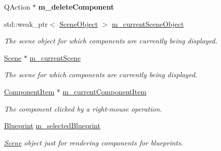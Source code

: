 \begin{Indent}
\begin{DoxyCompactItemize}
Q\+Action $\ast$ {\bfseries m\+\_\+delete\+Component}
\item 
\mbox{\label{classrev_1_1_view_1_1_component_tree_widget_aafbbd9c596409966bf652bde8aff2223}} 
std\+::weak\+\_\+ptr$<$ \mbox{\hyperlink{classrev_1_1_scene_object}{Scene\+Object}} $>$ \mbox{\hyperlink{classrev_1_1_view_1_1_component_tree_widget_aafbbd9c596409966bf652bde8aff2223}{m\+\_\+current\+Scene\+Object}}
\begin{DoxyCompactList}\small\item\em The scene object for which components are currently being displayed. \end{DoxyCompactList}\item 
\mbox{\label{classrev_1_1_view_1_1_component_tree_widget_aee6a1cb97bed994d615a6575bdf60327}} 
\mbox{\hyperlink{classrev_1_1_scene}{Scene}} $\ast$ \mbox{\hyperlink{classrev_1_1_view_1_1_component_tree_widget_aee6a1cb97bed994d615a6575bdf60327}{m\+\_\+current\+Scene}}
\begin{DoxyCompactList}\small\item\em The scene for which components are currently being displayed. \end{DoxyCompactList}\item 
\mbox{\label{classrev_1_1_view_1_1_component_tree_widget_aef937872f23a2d4a2eff96e8545c1eac}} 
\mbox{\hyperlink{classrev_1_1_view_1_1_component_item}{Component\+Item}} $\ast$ \mbox{\hyperlink{classrev_1_1_view_1_1_component_tree_widget_aef937872f23a2d4a2eff96e8545c1eac}{m\+\_\+current\+Component\+Item}}
\begin{DoxyCompactList}\small\item\em The component clicked by a right-\/mouse operation. \end{DoxyCompactList}\item 
\mbox{\label{classrev_1_1_view_1_1_component_tree_widget_ab3e7a3a926189033615e36899c9a218c}} 
\mbox{\hyperlink{classrev_1_1_blueprint}{Blueprint}} \mbox{\hyperlink{classrev_1_1_view_1_1_component_tree_widget_ab3e7a3a926189033615e36899c9a218c}{m\+\_\+selected\+Blueprint}}
\begin{DoxyCompactList}\small\item\em \mbox{\hyperlink{classrev_1_1_scene}{Scene}} object just for rendering components for blueprints. \end{DoxyCompactList}\item 

\end{DoxyCompactItemize}
\end{Indent}
